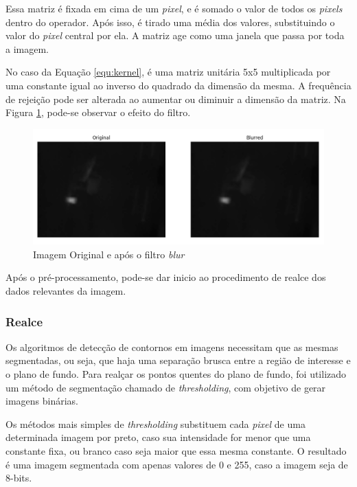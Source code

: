 		Essa matriz é fixada em cima de um \textit{pixel}, e é somado o valor de todos os \textit{pixels} dentro do operador. Após isso, é tirado uma média dos valores, substituindo o valor do \textit{pixel} central por ela. A matriz age como uma janela que passa por toda a imagem.
		
		 No caso da Equação \ref{equ:kernel}, é uma matriz unitária 5x5 multiplicada por uma constante igual ao inverso do quadrado da dimensão da mesma. A frequência de rejeição pode ser alterada ao aumentar ou diminuir a dimensão da matriz. Na Figura \ref{fig:blur}, pode-se observar o efeito do filtro.
		
		\begin{figure}[!ht]
		   \centering
		   \includegraphics[width=16cm]{Figures/blur.png}
		   \caption{Imagem Original e após o filtro \textit{blur}}
		   \label{fig:blur}
		\end{figure}
		
		Após o pré-processamento, pode-se dar inicio ao procedimento de realce dos dados relevantes da imagem.
		
		\subsubsection{Realce}
		
		Os algoritmos de detecção de contornos em imagens necessitam que as mesmas segmentadas, ou seja, que haja uma separação brusca entre a região de interesse e o plano de fundo. Para realçar os pontos quentes do plano de fundo, foi utilizado um método de segmentação chamado de \textit{thresholding}, com objetivo de gerar imagens binárias.
		
		Os métodos mais simples de \textit{thresholding} substituem cada \textit{pixel} de uma determinada imagem por preto, caso sua intensidade for menor que uma constante fixa, ou branco caso seja maior que essa mesma constante. O resultado é uma imagem segmentada com apenas valores de 0 e 255, caso a imagem seja de 8-bits.
		

